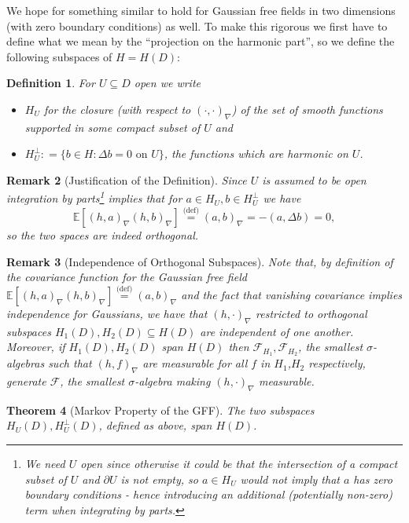 \documentclass[11pt,reqno]{amsart}
\numberwithin{equation}{section}
\newtheorem{thm}{Theorem}[section]
\newtheorem{defi}[thm]{Definition}
\newtheorem{rem}[thm]{Remark}
\newcommand{\eqbydef}{\mathrel{\stackrel{\text{(def)}}{=}}}
\newcommand{\deq}{\mathrel{\mathop:}=}
\begin{document}
We hope for something similar to hold for Gaussian free fields in two dimensions (with zero boundary conditions) as well. To make this rigorous we first have to define what we mean by the ``projection on the harmonic part'', so we define the following subspaces of $H=H(D)$:

\begin{defi}
	For $U\subseteq D$ open we write \begin{itemize}
		\item $H_U$ for the closure (with respect to $(\cdot,\cdot)_\nabla$) of the set of smooth functions supported in some compact subset of $U$ and
		\item $H_U^\perp\deq \{b\in H: \Delta b=0 \text{ on }U\}$, the functions which are harmonic on $U$.
	\end{itemize}
\end{defi}

\begin{rem}[Justification of the Definition]
	Since $U$ is assumed to be open integration by parts\footnote{We need $U$ open since otherwise it could be that the intersection of a compact subset of $U$ and $\partial U$ is not empty, so $a\in H_U$ would not imply that $a$ has zero boundary conditions - hence introducing an additional (potentially non-zero) term when integrating by parts.} implies that for $a\in H_U, b\in H_U^\perp$ we have $$\mathbb E[(h,a)_\nabla(h,b)_\nabla]\eqbydef (a,b)_\nabla = -(a,\Delta b)=0,$$
	so the two spaces are indeed orthogonal.
\end{rem}

\begin{rem}[Independence of Orthogonal Subspaces]
	Note that, by definition of the covariance function for the Gaussian free field $\mathbb E[(h,a)_\nabla(h,b)_\nabla]\eqbydef(a,b)_\nabla$ and the fact that vanishing covariance implies independence for Gaussians, we have that $(h,\cdot)_\nabla$ restricted to orthogonal subspaces $H_1(D),H_2(D)\subseteq H(D)$ are independent of one another. Moreover, if $H_1(D),H_2(D)$ span $H(D)$ then $\mathcal F_{H_1},\mathcal F_{H_2}$, the smallest $\sigma$-algebras such that $(h,f)_\nabla$ are measurable for all $f$ in $H_1$,$H_2$ respectively, generate $\mathcal F$, the smallest $\sigma$-algebra making $(h,\cdot)_\nabla$ measurable. 
\end{rem}

\begin{thm}[Markov Property of the GFF]\label{thm:MarkovProperty}
	The two subspaces $H_U(D), H_U^\perp(D)$, defined as above, span $H(D)$.
\end{thm}
\end{document}
